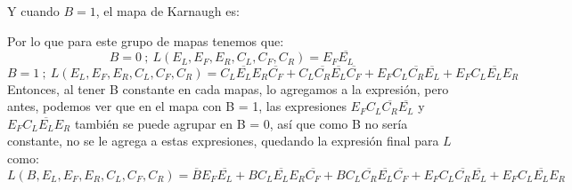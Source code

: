 \documentclass[a4paper]{article}
\begin{document}
Y cuando $B = 1$, el mapa de Karnaugh es:

\vspace{1cm}

Por lo que para este grupo de mapas tenemos que:
\begin{equation}
    B = 0\ ;\  L(E_L,E_F,E_R,C_L,C_F,C_R) = E_F \overline{E_L}
\end{equation}
\begin{equation}
    B = 1\ ;\  L(E_L,E_F,E_R,C_L,C_F,C_R) =  C_L \overline{E_L} E_R \overline{C_F} + C_L \overline{C_R} \overline{E_L} \overline{C_F} + E_F C_L \overline{C_R} \overline{E_L} + E_F C_L \overline{E_L} E_R
\end{equation}
Entonces, al tener B constante en cada mapas, lo agregamos a la expresión, pero antes, podemos ver que en el mapa con B = 1, las expresiones $E_F C_L \overline{C_R} \overline{E_L}$ y $E_F C_L \overline{E_L} E_R$ también se puede agrupar en B = 0, así que como B no sería constante, no se le agrega a estas expresiones, quedando la expresión final para $L$ como:
\begin{equation}
    L(B,E_L,E_F,E_R,C_L,C_F,C_R) = \overline{B} E_F \overline{E_L} + B C_L \overline{E_L} E_R \overline{C_F} + B C_L \overline{C_R} \overline{E_L} \overline{C_F} + E_F C_L \overline{C_R} \overline{E_L} + E_F C_L \overline{E_L} E_R
\end{equation}
\end{document}
